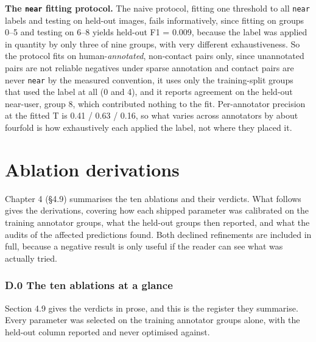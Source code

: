 \textbf{The \texttt{near} fitting protocol.} The naive protocol, fitting one threshold to all \texttt{near} labels and testing on held-out images, fails informatively, since fitting on groups 0--5 and testing on 6--8 yields held-out F1 = 0.009, because the label was applied in quantity by only three of nine groups, with very different exhaustiveness. So the protocol fits on human-\textit{annotated}, non-contact pairs only, since unannotated pairs are not reliable negatives under sparse annotation and contact pairs are never \texttt{near} by the measured convention, it uses only the training-split groups that used the label at all (0 and 4), and it reports agreement on the held-out near-user, group 8, which contributed nothing to the fit. Per-annotator precision at the fitted T is 0.41 / 0.63 / 0.16, so what varies across annotators by about fourfold is how exhaustively each applied the label, not where they placed it.


\chapter{Ablation derivations}


Chapter 4 (\S{}4.9) summarises the ten ablations and their verdicts. What follows gives the derivations, covering how each shipped parameter was calibrated on the training annotator groups, what the held-out groups then reported, and what the audits of the affected predictions found. Both declined refinements are included in full, because a negative result is only useful if the reader can see what was actually tried.

\subsection{D.0 The ten ablations at a glance}

Section 4.9 gives the verdicts in prose, and this is the register they summarise. Every parameter was selected on the training annotator groups alone, with the held-out column reported and never optimised against.

